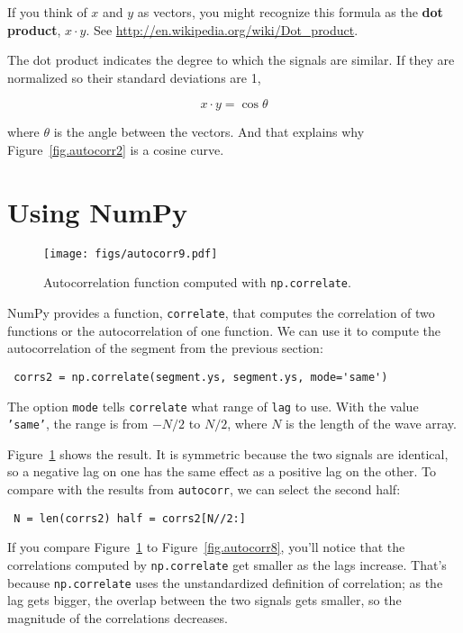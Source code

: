 \documentclass[12pt]{book} \usepackage[width=5.5in,height=8.5in, hmarginratio=3:2,vmarginratio=1:1]{geometry}
\begin{document}
If you think of $x$ and $y$ as vectors, you might recognize this formula as the {\bf dot product}, $x \cdot y$. See \url{http://en.wikipedia.org/wiki/Dot_product}. 

\newcommand{\norm}{\mathrm{norm}} 

The dot product indicates the degree to which the signals are similar. If they are normalized so their standard deviations are 1, 

%
\[ x \cdot y = \cos \theta \] 

%
where $\theta$ is the angle between the vectors. And that explains why Figure~\ref{fig.autocorr2} is a cosine curve. 

\section{Using NumPy} \label{correlate} 

\begin{figure} 

\centerline{\texttt{[image: figs/autocorr9.pdf]}} \caption{Autocorrelation function computed with {\tt np.correlate}.} \label{fig.autocorr9} \end{figure} 

NumPy provides a function, {\tt correlate}, that computes the correlation of two functions or the autocorrelation of one function. We can use it to compute the autocorrelation of the segment from the previous section: 

\begin{verbatim} corrs2 = np.correlate(segment.ys, segment.ys, mode='same') \end{verbatim} 

The option {\tt mode} tells {\tt correlate} what range of {\tt lag} to use. With the value {\tt 'same'}, the range is from $-N/2$ to $N/2$, where $N$ is the length of the wave array. 

Figure~\ref{fig.autocorr9} shows the result. It is symmetric because the two signals are identical, so a negative lag on one has the same effect as a positive lag on the other. To compare with the results from {\tt autocorr}, we can select the second half: 

\begin{verbatim} N = len(corrs2) half = corrs2[N//2:] \end{verbatim} 

If you compare Figure~\ref{fig.autocorr9} to Figure~\ref{fig.autocorr8}, you'll notice that the correlations computed by {\tt np.correlate} get smaller as the lags increase. That's because {\tt np.correlate} uses the unstandardized definition of correlation; as the lag gets bigger, the overlap between the two signals gets smaller, so the magnitude of the correlations decreases. 
\end{document}
